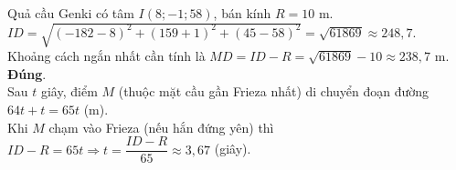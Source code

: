 \begin{ex}
{\begin{itemchoice}
\begin{center}
			\end{center}
			 Quả cầu Genki có tâm $I(8;-1; 58)$, bán kính $R=10$ m.\\
			$ID=\sqrt{(-182-8)^2+(159+1)^2+(45-58)^2}=\sqrt{61869} \approx  248{,}7$.\\
			Khoảng cách ngắn nhất cần tính là  $MD=ID-R=\sqrt{61869}-10\approx 238{,}7$ m.
			\itemch \textbf{Đúng}.\\ 
			 Sau $t$ giây, điểm $M$ (thuộc mặt cầu gần Frieza nhất) di chuyển đoạn đường $64t+t=65t$ (m).\\
			Khi $M$ chạm vào Frieza (nếu hắn đứng yên)  thì $ID-R=65t\Rightarrow t=\dfrac{ID-R}{65} \approx 3{,}67$ (giây).
		\end{itemchoice}
	} 
\end{ex}

